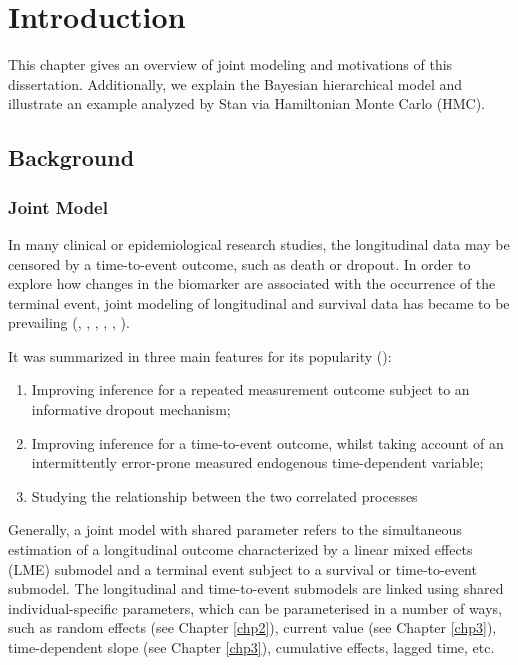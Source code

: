 \chapter{Introduction} \label{chp1}

This chapter gives an overview of joint modeling and motivations of this dissertation. Additionally, we explain the Bayesian hierarchical model and illustrate an example analyzed by Stan via Hamiltonian Monte Carlo (HMC).  

\section{Background}
\subsection{Joint Model}

In many clinical or epidemiological research studies, the longitudinal data may be censored by a time-to-event outcome, such as death or dropout. In order to explore how changes in the biomarker are associated with the occurrence of the terminal event, joint modeling of longitudinal and survival data has became to be prevailing (\cite{Tsiatis2004}, \cite{Henderson2000}, \cite{Rizopoulos2012}, \cite{Ibrahim2010}, \cite{Wulfsohn1997}, \cite{Asar2015}). 

It was summarized in three main features for its popularity (\cite{Hickey2016}):

\begin{enumerate}
    \item Improving inference for a repeated measurement outcome subject to an informative dropout mechanism;
    \item Improving inference for a time-to-event outcome, whilst taking account of an intermittently error-prone measured endogenous time-dependent variable;
    \item Studying the relationship between the two correlated processes
\end{enumerate}
Generally, a joint model with shared parameter refers to the simultaneous estimation of a longitudinal outcome characterized by a linear mixed effects (LME) submodel and a terminal event subject to a survival or time-to-event submodel. The longitudinal and time-to-event submodels are linked using shared individual-specific parameters, which can be parameterised in a number of ways, such as random effects (see Chapter \ref{chp2}), current value (see Chapter \ref{chp3}), time-dependent slope (see Chapter \ref{chp3}), cumulative effects, lagged time, etc.      

